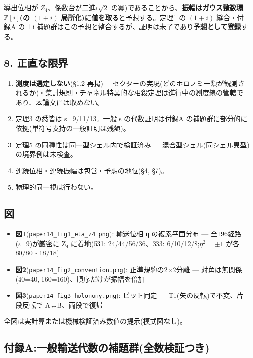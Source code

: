 \documentclass[
]{ltjsarticle}
\providecommand{\tightlist}{%
  \setlength{\itemsep}{0pt}\setlength{\parskip}{0pt}}
\begin{document}
導出位相が \(Z_4\)、係数台が二進(\(\sqrt2\)
の冪)であることから、\textbf{振幅はガウス整数環 \(\mathbb{Z}[i]\)(の
\((1+i)\) 局所化)に値を取る}と予想する。定理1 の \((1+i)\) 縫合・付録A
の ±i
補題群はこの予想と整合するが、証明は未了であり\textbf{予想として登録}する。

\subsection{8. 正直な限界}\label{ux6b63ux76f4ux306aux9650ux754c}

\begin{enumerate}
\def\labelenumi{\arabic{enumi}.}
\tightlist
\item
  \textbf{測度は選定しない}(§1.2 再掲)---
  セクターの実現(どのホロノミー類が観測されるか)・集計規則・チャネル特異的な相殺定理は進行中の測度線の管轄であり、本論文には収めない。
\item
  定理3 の悉皆は s=9/11/13。一般 s の代数証明は付録A
  の補題群に部分的に依拠(単符号支持の一般証明は残額)。
\item
  定理5 の同種性は同一型シェル内で検証済み ---
  混合型シェル(同シェル異型)の境界例は未検査。
\item
  連続位相・連続振幅は包含・予想の地位(§4, §7)。
\item
  物理的同一視は行わない。
\end{enumerate}

\subsection{図}\label{ux56f3}

\begin{itemize}
\tightlist
\item
  \textbf{図1}(\texttt{paper14\_fig1\_eta\_z4.png}): 輸送位相 η
  の複素平面分布 --- 全196経路(s=9)が厳密に Z₄ に着地(531:
  24/44/56/36、333: 6/10/12/8;\(\eta^2=\pm1\) が各80/80・18/18)
\item
  \textbf{図2}(\texttt{paper14\_fig2\_convention.png}):
  正準規約の2×2分離 --- 対角は無関係(40=40,
  160=160)、順序だけが振幅を倍加
\item
  \textbf{図3}(\texttt{paper14\_fig3\_holonomy.png}): ビット同定 ---
  T1(矢の反転)で不変、片段反転で A↔B、両段で復帰
\end{itemize}

全図は実計算または機械検証済み数値の提示(模式図なし)。

\subsection{付録A:一般輸送代数の補題群(全数検証つき)}\label{ux4ed8ux9332aux4e00ux822cux8f38ux9001ux4ee3ux6570ux306eux88dcux984cux7fa4ux5168ux6570ux691cux8a3cux3064ux304d}
\end{document}
